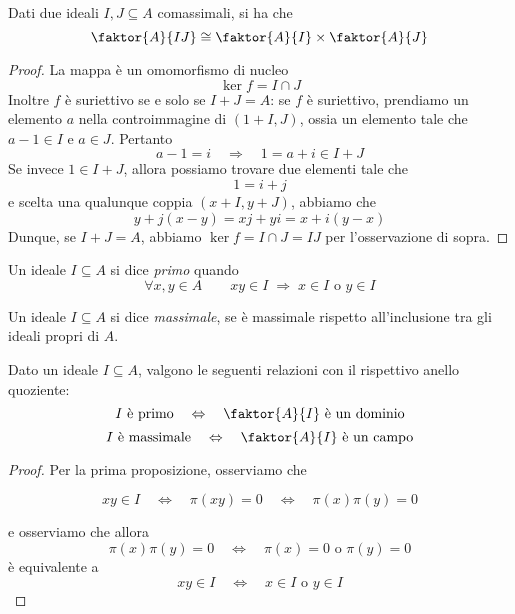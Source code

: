 \begin{multicols}{2}
\begin{theorem}
	Dati due ideali $ I, J \subseteq A $ comassimali, si ha che
	\[ \faktor{A}{IJ} \cong \faktor{A}{I} \times \faktor{A}{J} \]
\end{theorem}
\begin{proof}
	La mappa
	è un omomorfismo di nucleo
	\[ \ker f = I \cap J \]
	Inoltre $ f $ è suriettivo se e solo se $ I + J = A $: se $ f $ è suriettivo, prendiamo un elemento $ a $ nella controimmagine di $ (1 + I, J) $, ossia un elemento tale che 
	$ a-1 \in I $ e $ a \in J $.
	Pertanto 
	\[ a-1 = i \quad\Rightarrow\quad 1 = a + i \in I + J \]
	Se invece $ 1 \in I + J $, allora possiamo trovare due elementi tale che \[ 1 = i + j \]
	e scelta una qualunque coppia $ (x + I, y + J) $, abbiamo che
	\[ y + j(x-y) = xj + yi = x + i(y-x) \]
	Dunque, se $ I + J = A $, abbiamo $ \ker f = I \cap J = IJ $ per l'osservazione di sopra.
\end{proof}

\begin{definition}
	Un ideale $ I \subseteq A $ si dice \emph{primo} quando
	\[ \forall x, y \in A \qquad xy \in I \;\Rightarrow\; x \in I \text{ o } y \in I \]
\end{definition}

\begin{definition}
	Un ideale $ I \subseteq A $ si dice \emph{massimale}, se è massimale rispetto all'inclusione tra gli ideali propri di $ A $.
\end{definition}

\begin{theorem}\label{idealequoziente}
	Dato un ideale $ I \subseteq A $, valgono le seguenti relazioni con il rispettivo anello quoziente:
	\[ I \text{ è primo} \quad\Leftrightarrow\quad \faktor{A}{I} \text{ è  un dominio} \]
	\[ I \text{ è massimale} \quad\Leftrightarrow\quad \faktor{A}{I} \text{ è un campo} \]
\end{theorem}

\begin{proof}
	Per la prima proposizione, osserviamo che
	
	\[xy \in I \quad\Leftrightarrow\quad \pi(xy) = 0 
	\quad\Leftrightarrow\quad \pi(x)\pi(y) = 0 \]
	
	e osserviamo che allora
	\[ \pi(x)\pi(y) = 0 \quad\Leftrightarrow\quad \pi(x) =0 \text{ o } \pi(y) = 0   \]
	è equivalente a 
	\[ xy \in I \quad\Leftrightarrow\quad x \in I \text{ o } y \in I  \]
	

\end{proof}
\end{multicols}
